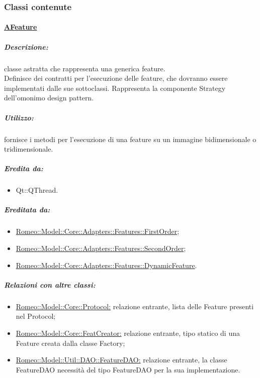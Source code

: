 		\subsubsection{Classi contenute}
		\paragraph{\underline{AFeature}}
		\label{features::features} 
		
			\subparagraph{Descrizione:} classe astratta che rappresenta una generica feature\g{}. \\Definisce dei contratti per l’esecuzione delle feature\g{}, che dovranno essere implementati dalle sue sottoclassi. Rappresenta la componente Strategy dell’omonimo design pattern\g{}.
			
			\subparagraph{Utilizzo:} fornisce i metodi per l’esecuzione di una feature\g{} su un immagine bidimensionale o tridimensionale.
			
			\subparagraph{Eredita da:}
				\begin{itemize}
					\item Qt::QThread.
				\end{itemize}
				
			\subparagraph{Ereditata da:}
				\begin{itemize}
					\item \hyperref[features:fistorder]{Romeo::Model::Core::Adapters::Features::FirstOrder};
					\item \hyperref[features:secondorder]{Romeo::Model::Core::Adapters::Features::SecondOrder};
					\item \hyperref[features::dynamic]{Romeo::Model::Core::Adapters::Features::DynamicFeature}.
				\end{itemize}
				
			\subparagraph{Relazioni con altre classi:}
				\begin{itemize}
					\item \hyperref[protocol]{Romeo::Model::Core::Protocol:} relazione entrante, lista delle Feature\g{} presenti nel Protocol\g{};
				
					\item \hyperref[featC]{Romeo::Model::Core::FeatCreator:} relazione entrante, tipo statico di una Feature\g{} creata dalla classe Factory;
					
					\item \hyperref[]{Romeo::Model::Util::DAO::FeatureDAO:} relazione entrante, la classe FeatureDAO necessità del tipo FeatureDAO per la sua implementazione.

					
				\end{itemize}
		
